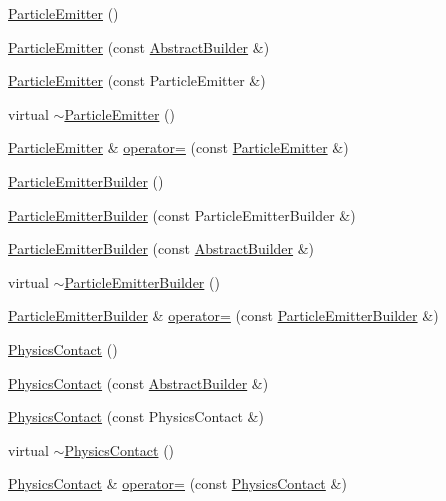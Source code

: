 \begin{DoxyCompactItemize}
\item 
\hyperlink{namespacejli_ab1f3dc735d96dcdd2317b120e891fe1d}{Particle\+Emitter} ()
\item 
\hyperlink{namespacejli_a67f3ed93a69d21806745184d7cb360d4}{Particle\+Emitter} (const \hyperlink{classjli_1_1_abstract_builder}{Abstract\+Builder} \&)
\item 
\hyperlink{namespacejli_a94ad1ef2b2c9ae784aced6edf424e99f}{Particle\+Emitter} (const Particle\+Emitter \&)
\item 
virtual \hyperlink{namespacejli_a384ce52e7a05b4b95159acd26146f2fc}{$\sim$\+Particle\+Emitter} ()
\item 
\hyperlink{namespacejli_ab1f3dc735d96dcdd2317b120e891fe1d}{Particle\+Emitter} \& \hyperlink{namespacejli_ac893115fd88948e8e12c6f372b374892}{operator=} (const \hyperlink{namespacejli_ab1f3dc735d96dcdd2317b120e891fe1d}{Particle\+Emitter} \&)
\item 
\hyperlink{namespacejli_a924f0dead47ff62cb75f7887a1790c88}{Particle\+Emitter\+Builder} ()
\item 
\hyperlink{namespacejli_a544df46fc4d6629db7189ee3abaca6d1}{Particle\+Emitter\+Builder} (const Particle\+Emitter\+Builder \&)
\item 
\hyperlink{namespacejli_aaa81a58aa861c9250324078f76f6e673}{Particle\+Emitter\+Builder} (const \hyperlink{classjli_1_1_abstract_builder}{Abstract\+Builder} \&)
\item 
virtual \hyperlink{namespacejli_aacab585b70e497e16db1e432f1d9a8ce}{$\sim$\+Particle\+Emitter\+Builder} ()
\item 
\hyperlink{namespacejli_a924f0dead47ff62cb75f7887a1790c88}{Particle\+Emitter\+Builder} \& \hyperlink{namespacejli_a4ffcb7b3f0bada7c0e33cc9ffc502c11}{operator=} (const \hyperlink{namespacejli_a924f0dead47ff62cb75f7887a1790c88}{Particle\+Emitter\+Builder} \&)
\item 
\hyperlink{namespacejli_a87bec69a241d3a7d72c6a92035e457d7}{Physics\+Contact} ()
\item 
\hyperlink{namespacejli_ac44112ea315e999b0803a46be73ec2ea}{Physics\+Contact} (const \hyperlink{classjli_1_1_abstract_builder}{Abstract\+Builder} \&)
\item 
\hyperlink{namespacejli_a6c69c031c6a878af0fd0c049d6373d72}{Physics\+Contact} (const Physics\+Contact \&)
\item 
virtual \hyperlink{namespacejli_a8c00d7a02e65a5f0bbb102633d1ec822}{$\sim$\+Physics\+Contact} ()
\item 
\hyperlink{namespacejli_a87bec69a241d3a7d72c6a92035e457d7}{Physics\+Contact} \& \hyperlink{namespacejli_a954927e0e64c45ab4101c5f1a225bc8b}{operator=} (const \hyperlink{namespacejli_a87bec69a241d3a7d72c6a92035e457d7}{Physics\+Contact} \&)

\end{DoxyCompactItemize}
